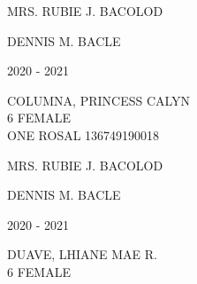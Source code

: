 \documentclass{article}
\begin{document}
{{\begin{multicols}{2}
\vspace*{25mm}
\begin{flushright}
MRS. RUBIE J. BACOLOD \hspace*{-1.5em}
\end{flushright}  
\vspace*{1.5mm}
\hspace*{3em} DENNIS M. BACLE
\end{multicols} 
\newpage
\begin{multicols}{2}
\phantom{u}
\columnbreak
\vspace*{-3mm}
\begin{center}
\phantom{school year:} \hspace*{6em} 2020 - 2021 
\end{center} 
\vspace{4mm} 
\phantom{Name:} \hspace*{5em} COLUMNA, PRINCESS CALYN \\[2.5mm] %
\phantom{Age} \hspace*{8em} 6  \phantom{Sex} \hspace*{12em} FEMALE \\[2.5mm] %
\phantom{Grade} \hspace*{3em} ONE \phantom{Section} \hspace*{4em} ROSAL \phantom{LRN} \hspace*{4em} 136749190018 \\
\vspace*{25mm}
\begin{flushright}
MRS. RUBIE J. BACOLOD \hspace*{-1.5em}
\end{flushright}  
\vspace*{1.5mm}
\hspace*{3em} DENNIS M. BACLE
\end{multicols} 
\newpage
\begin{multicols}{2}
\phantom{u}
\columnbreak
\vspace*{-3mm}
\begin{center}
\phantom{school year:} \hspace*{6em} 2020 - 2021 
\end{center} 
\vspace{4mm} 
\phantom{Name:} \hspace*{5em} DUAVE, LHIANE MAE R. \\[2.5mm] %
\phantom{Age} \hspace*{8em} 6  \phantom{Sex} \hspace*{12em} FEMALE \\[2.5mm] %

\end{multicols}}}
\end{document}
